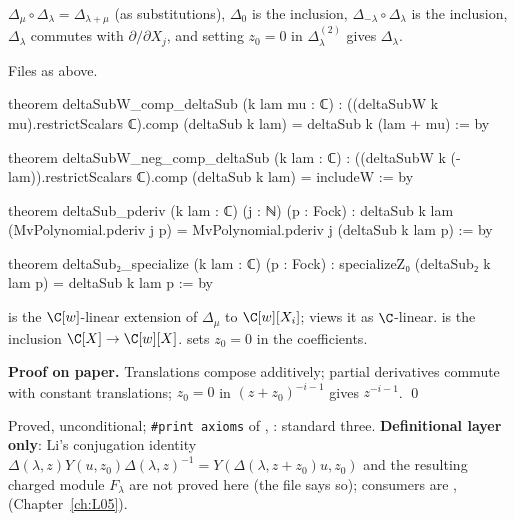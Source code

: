 \begin{theorem}\label{l11:thm:lidelta}
$\Delta_\mu\circ\Delta_\lambda = \Delta_{\lambda+\mu}$ (as substitutions), $\Delta_0$ is the inclusion, $\Delta_{-\lambda}\circ\Delta_\lambda$ is the
inclusion, $\Delta_\lambda$ commutes with $\partial/\partial X_j$, and setting $z_0 = 0$ in $\Delta^{(2)}_\lambda$ gives $\Delta_\lambda$.
\end{theorem}
\noindent Files as above.
\begin{leancode}
theorem deltaSubW_comp_deltaSub (k lam mu : ℂ) :
    ((deltaSubW k mu).restrictScalars ℂ).comp (deltaSub k lam) = deltaSub k (lam + mu) := by

theorem deltaSubW_neg_comp_deltaSub (k lam : ℂ) :
    ((deltaSubW k (-lam)).restrictScalars ℂ).comp (deltaSub k lam) = includeW := by

theorem deltaSub_pderiv (k lam : ℂ) (j : ℕ) (p : Fock) :
    deltaSub k lam (MvPolynomial.pderiv j p)
      = MvPolynomial.pderiv j (deltaSub k lam p) := by

theorem deltaSub₂_specialize (k lam : ℂ) (p : Fock) :
    specializeZ₀ (deltaSub₂ k lam p) = deltaSub k lam p := by
\end{leancode}

\begin{dictionary}
 is the $\C[w]$-linear extension of $\Delta_\mu$ to $\C[w][X_i]$;  views it as $\C$-linear.
 is the inclusion $\C[X]\to\C[w][X]$.  sets $z_0 = 0$ in the coefficients.
\end{dictionary}

\textbf{Proof on paper.} Translations compose additively; partial derivatives commute with constant translations; $z_0 = 0$ in
$(z+z_0)^{-i-1}$ gives $z^{-i-1}$. \qed

\begin{status}
Proved, unconditional; \texttt{\#print axioms} of \allowbreak{}\allowbreak{}\allowbreak{},
\allowbreak{}\allowbreak{}\allowbreak{}\allowbreak{}: standard three. \textbf{Definitional layer only}: Li's conjugation identity
$\Delta(\lambda,z)Y(u,z_0)\Delta(\lambda,z)^{-1} = Y(\Delta(\lambda,z+z_0)u,z_0)$ and the resulting charged module $F_\lambda$ are not proved
here (the file says so); consumers are ,  (Chapter~\ref{ch:L05}).
\end{status}

